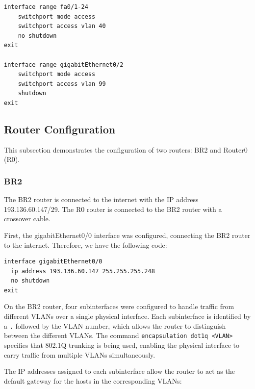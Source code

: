 \begin{lstlisting}[caption={Access port configuration on SW8}, label={lst:sw8-access}]
interface range fa0/1-24
    switchport mode access
    switchport access vlan 40
    no shutdown
exit

interface range gigabitEthernet0/2
    switchport mode access
    switchport access vlan 99
    shutdown
exit    
\end{lstlisting}

\subsection{Router Configuration}
This subsection demonstrates the configuration of two routers: BR2 and Router0 (R0).
\vspace{0.1cm}
\subsubsection*{BR2}

The BR2 router is connected to the internet with the IP address 193.136.60.147/29. The R0 router is connected to the BR2 router with a crossover cable.

First, the gigabitEthernet0/0 interface was configured, connecting the BR2 router to the internet. Therefore, we have the following code:

\begin{lstlisting}[caption={Interface GigabitEthernet0/0 Configuration}, label={lst:intf-gb0/0}]
interface gigabitEthernet0/0
  ip address 193.136.60.147 255.255.255.248
  no shutdown
exit
\end{lstlisting}

On the BR2 router, four subinterfaces were configured to handle traffic from different VLANs over a single physical interface. Each subinterface is identified by a \texttt{.} followed by the VLAN number, which allows the router to distinguish between the different VLANs. The command \texttt{encapsulation dot1q <VLAN>} specifies that 802.1Q trunking is being used, enabling the physical interface to carry traffic from multiple VLANs simultaneously.

The IP addresses assigned to each subinterface allow the router to act as the default gateway for the hosts in the corresponding VLANs:


